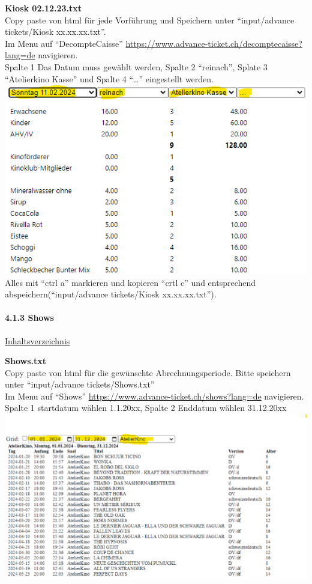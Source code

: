 \documentclass[
]{article}
\begin{document}
\textbf{Kiosk 02.12.23.txt}\\
Copy paste von html für jede Vorführung und Speichern unter
``input/advance tickets/Kiosk xx.xx.xx.txt''.\\
Im Menu auf ``DecompteCaisse''
\url{https://www.advance-ticket.ch/decomptecaisse?lang=de} navigieren.\\
Spalte 1 Das Datum muss gewählt werden, Spalte 2 ``reinach'', Splate 3
``Atelierkino Kasse'' und Spalte 4 ``\ldots{}'' eingestellt werden.\\
\includegraphics{doc/Kiosk.png}\\
Alles mit ``ctrl a'' markieren und kopieren ``crtl c'' und entsprechend
abspeichern(``input/advance tickets/Kiosk xx.xx.xx.txt'').

\paragraph{4.1.3 Shows}\label{shows}

\hyperref[Inhaltsverzeichnis]{Inhaltsverzeichnis}

\textbf{Shows.txt}\\
Copy paste von html für die gewünschte Abrechnungsperiode. Bitte
speichern unter ``input/advance tickets/Shows.txt''\\
Im Menu auf ``Shows'' \url{https://www.advance-ticket.ch/shows?lang=de}
navigieren.\\
Spalte 1 startdatum wählen 1.1.20xx, Spalte 2 Enddatum wählen
31.12.20xx\\
\includegraphics{doc/shows.png}
\end{document}

